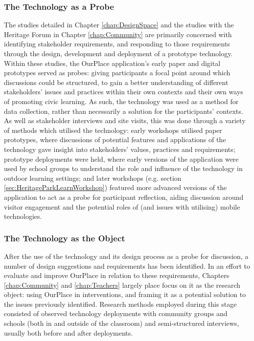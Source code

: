 \subsubsection{The Technology as a Probe}
The studies detailed in Chapter \ref{chap:DesignSpace} and the studies with the Heritage Forum in Chapter \ref{chap:Community} are primarily concerned with identifying stakeholder requirements, and responding to those requirements through the design, development and deployment of a prototype technology. Within these studies, the OurPlace application's early paper and digital prototypes served as probes: giving participants a focal point around which discussions could be structured, to gain a better understanding of different stakeholders’ issues and practices within their own contexts and their own ways of promoting civic learning. As such, the technology was used as a method for data collection, rather than necessarily a solution for the participants' contexts. As well as stakeholder interviews and site visits, this was done through a variety of methods which utilised the technology: early workshops utilised paper prototypes, where discussions of potential features and applications of the technology gave insight into stakeholders' values, practices and requirements; prototype deployments were held, where early versions of the application were used by school groups to understand the role and influence of the technology in outdoor learning settings; and later workshops (e.g. section \ref{sec:HeritageParkLearnWorkshop}) featured more advanced versions of the application to act as a probe for participant reflection, aiding discussion around visitor engagement and the potential roles of (and issues with utilising) mobile technologies. 

\subsubsection{The Technology as the Object}
After the use of the technology and its design process as a probe for discussion, a number of design suggestions and requirements has been identified. In an effort to evaluate and improve OurPlace in relation to these requirements, Chapters \ref{chap:Community} and \ref{chap:Teachers} largely place focus on it as the research object: using OurPlace in interventions, and framing it as a potential solution to the issues previously identified. Research methods employed during this stage consisted of observed technology deployments with community groups and schools (both in and outside of the classroom) and semi-structured interviews, usually both before and after deployments.

